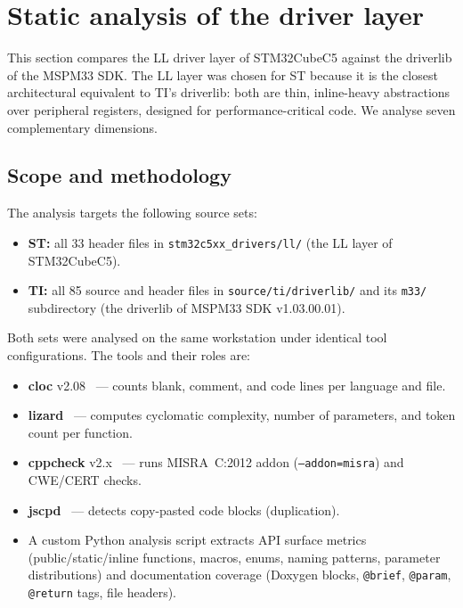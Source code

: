 \section{Static analysis of the driver layer}
\label{sec:ti-static-analysis}

This section compares the LL driver layer of STM32CubeC5 against the driverlib of the
MSPM33 SDK. The LL layer was chosen for ST because it is the closest architectural
equivalent to TI's driverlib: both are thin, inline-heavy abstractions over peripheral
registers, designed for performance-critical code. We analyse seven complementary
dimensions.

\subsection{Scope and methodology}
\label{subsec:ti-scope}

The analysis targets the following source sets:

\begin{itemize}
  \item \textbf{ST:} all 33 header files in
        \texttt{stm32c5xx\_drivers/ll/} (the LL layer of STM32CubeC5).
  \item \textbf{TI:} all 85 source and header files in
        \texttt{source/ti/driverlib/} and its \texttt{m33/} subdirectory
        (the driverlib of MSPM33 SDK v1.03.00.01).
\end{itemize}

Both sets were analysed on the same workstation under identical tool configurations. The
tools and their roles are:

\begin{itemize}
  \item \textbf{cloc} v2.08~\cite{cloc-tool} --- counts blank, comment, and code lines per
        language and file.
  \item \textbf{lizard}~\cite{lizard-tool} --- computes cyclomatic complexity, number of
        parameters, and token count per function.
  \item \textbf{cppcheck} v2.x~\cite{cppcheck-tool} --- runs MISRA~C:2012 addon
        (\texttt{--addon=misra}) and CWE/CERT checks.
  \item \textbf{jscpd}~\cite{jscpd-tool} --- detects copy-pasted code blocks (duplication).
      \item A custom Python analysis script extracts API surface
        metrics (public/static/inline functions, macros, enums, naming patterns, parameter
        distributions) and documentation coverage (Doxygen blocks, \texttt{@brief},
        \texttt{@param}, \texttt{@return} tags, file headers).
\end{itemize}

